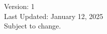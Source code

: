\documentclass[12pt,letterpaper]{article}
\begin{document}
\begin{tabularx}{\textwidth}{|p{}|p{}||p{}|}



















\end{tabularx}

\centering
Version: 1\\
Last Updated: January 12, 2025\\
Subject to change.
\end{document}
